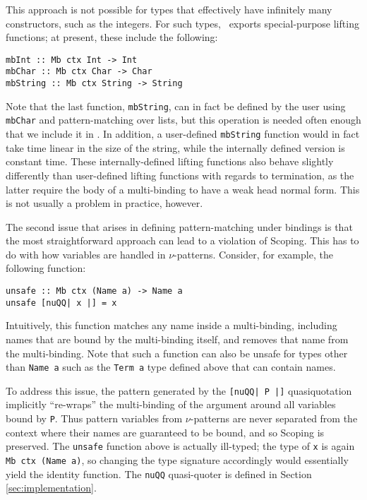 \documentclass[natbib]{sigplanconf}
\begin{document}
This approach is not possible for types that effectively have
infinitely many constructors, such as the integers. For such types,
\ourlib\ exports special-purpose lifting functions; at present,
these include the following:
\begin{lstlisting}
mbInt :: Mb ctx Int -> Int
mbChar :: Mb ctx Char -> Char
mbString :: Mb ctx String -> String
\end{lstlisting}
Note that the last function, \lstinline{mbString}, can in fact be
defined by the user using \lstinline{mbChar} and pattern-matching over
lists, but this operation is needed often enough that we include it in
\ourlib. In addition, a user-defined \lstinline{mbString} function
would in fact take time linear in the size of the string, while the
internally defined version is constant time. These internally-defined
lifting functions also behave slightly differently than user-defined
lifting functions with regards to termination, as the latter require
the body of a multi-binding to have a weak head normal form. This is
not usually a problem in practice, however.


The second issue that arises in defining pattern-matching under
bindings is that the most straightforward approach can lead to a
violation of Scoping. This has to do with how variables are handled in
$\nu$-patterns. Consider, for example, the following function:
\begin{lstlisting}
unsafe :: Mb ctx (Name a) -> Name a
unsafe [nuQQ| x |] = x
\end{lstlisting}
Intuitively, this function matches any name inside a multi-binding,
including names that are bound by the multi-binding itself, and
removes that name from the multi-binding. Note that such a function
can also be unsafe for types other than \lstinline{Name a} such as
the \lstinline{Term a} type defined above that can contain names.

To address this issue, the pattern generated by the
\lstinline{[nuQQ| P |]} quasiquotation implicitly ``re-wraps'' the
multi-binding of the argument around all variables bound by
\lstinline{P}. Thus pattern variables from $\nu$-patterns are never
separated from the context where their names are guaranteed to be
bound, and so Scoping is preserved. The \lstinline{unsafe} function
above is actually ill-typed; the type of \lstinline{x} is again
\lstinline{Mb ctx (Name a)}, so changing the type signature
accordingly would essentially yield the identity function. The
\lstinline{nuQQ} quasi-quoter is defined in Section
\ref{sec:implementation}.
\end{document}
